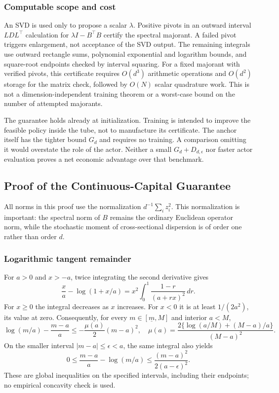 \subsubsection{Computable scope and cost}
An SVD is used only to propose a scalar $\lambda$. Positive pivots in an outward interval $LDL^\top$ calculation for $\lambda I-B^\top B$ certify the spectral majorant. A failed pivot triggers enlargement, not acceptance of the SVD output. The remaining integrals use outward rectangle sums, polynomial exponential and logarithm bounds, and square-root endpoints checked by interval squaring. For a fixed majorant with verified pivots, this certificate requires $O(d^3)$ arithmetic operations and $O(d^2)$ storage for the matrix check, followed by $O(N)$ scalar quadrature work. This is not a dimension-independent training theorem or a worst-case bound on the number of attempted majorants.

The guarantee holds already at initialization. Training is intended to improve the feasible policy inside the tube, not to manufacture its certificate. The anchor itself has the tighter bound $G_d$ and requires no training. A comparison omitting it would overstate the role of the actor. Neither a small $G_d+D_{d,\epsilon}$ nor faster actor evaluation proves a net economic advantage over that benchmark.
\subsection{Proof of the Continuous-Capital Guarantee}\label{app:r10proof}
All norms in this proof use the normalization $d^{-1}\sum_i z_i^2$. This normalization is important: the spectral norm of $B$ remains the ordinary Euclidean operator norm, while the stochastic moment of cross-sectional dispersion is of order one rather than order $d$.

\subsubsection{Logarithmic tangent remainder}
For $a>0$ and $x>-a$, twice integrating the second derivative gives
\[
 \frac{x}{a}-\log(1+x/a)
 =x^2\int_0^1\frac{1-r}{(a+rx)^2}\,dr.
\]
For $x\geq0$ the integral decreases as $x$ increases. For $x<0$ it is at least $1/(2a^2)$, its value at zero. Consequently, for every $m\in[\underline m,M]$ and interior $a<M$,
\begin{equation}\label{eq:r10loglemma}
 \log(m/a)-\frac{m-a}{a}
 \leq-\frac{\mu(a)}2(m-a)^2,
 \quad
 \mu(a)=\frac{2\{\log(a/M)+(M-a)/a\}}{(M-a)^2}.
\end{equation}
On the smaller interval $|m-a|\leq\epsilon<a$, the same integral also yields
\begin{equation}\label{eq:r10logupper}
 0\leq\frac{m-a}{a}-\log(m/a)
 \leq\frac{(m-a)^2}{2(a-\epsilon)^2}.
\end{equation}
These are global inequalities on the specified intervals, including their endpoints; no empirical concavity check is used.

